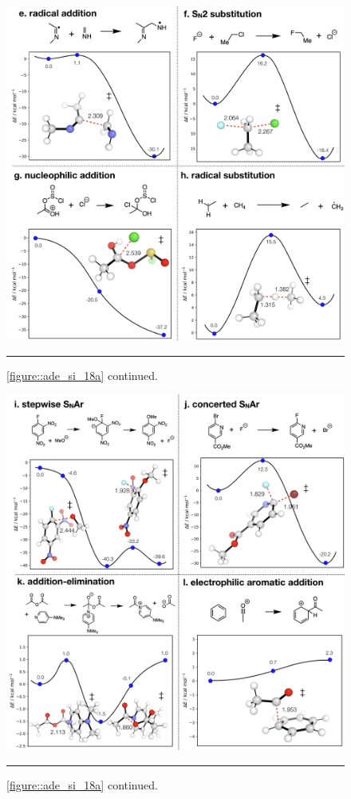 \documentclass[../../main.tex]{subfiles}
\begin{document}
\begin{figure}[h!]
	\vspace{0.4cm}
	\centering
	\includegraphics[width=\textwidth]{5/autode/figs/figS18e-h}
	\vspace{0.2cm}
	\hrule
	\caption{\figurename{ \ref{figure::ade_si_18a}} continued.}
	\label{fig::ade_si_18e}
\end{figure}


\begin{figure}[h!]
	\vspace{0.4cm}
	\centering
	\includegraphics[width=\textwidth]{5/autode/figs/figS18i-l}
	\vspace{0.2cm}
	\hrule
	\caption{\figurename{ \ref{figure::ade_si_18a}} continued.}
	\label{fig::ade_si_18i}
\end{figure}
\end{document}
